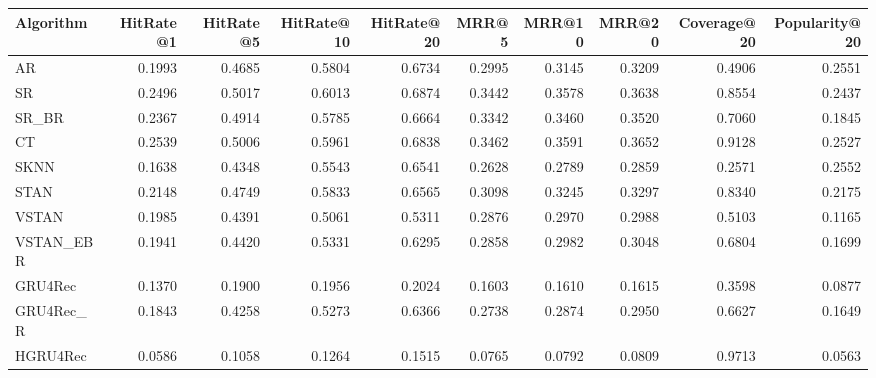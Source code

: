 \begin{tabular}{lrrrrrrrrr}
\toprule
 Algorithm &  HitRate@1 &  HitRate@5 &  HitRate@10 &  HitRate@20 &   MRR@5 &  MRR@10 &  MRR@20 &  Coverage@20 &  Popularity@20 \\
\midrule
        AR &     0.1993 &     0.4685 &      0.5804 &      0.6734 &  0.2995 &  0.3145 &  0.3209 &       0.4906 &         0.2551 \\
        SR &     0.2496 &     0.5017 &      0.6013 &      0.6874 &  0.3442 &  0.3578 &  0.3638 &       0.8554 &         0.2437 \\
     SR\_BR &     0.2367 &     0.4914 &      0.5785 &      0.6664 &  0.3342 &  0.3460 &  0.3520 &       0.7060 &         0.1845 \\
        CT &     0.2539 &     0.5006 &      0.5961 &      0.6838 &  0.3462 &  0.3591 &  0.3652 &       0.9128 &         0.2527 \\
      SKNN &     0.1638 &     0.4348 &      0.5543 &      0.6541 &  0.2628 &  0.2789 &  0.2859 &       0.2571 &         0.2552 \\
      STAN &     0.2148 &     0.4749 &      0.5833 &      0.6565 &  0.3098 &  0.3245 &  0.3297 &       0.8340 &         0.2175 \\
     VSTAN &     0.1985 &     0.4391 &      0.5061 &      0.5311 &  0.2876 &  0.2970 &  0.2988 &       0.5103 &         0.1165 \\
 VSTAN\_EBR &     0.1941 &     0.4420 &      0.5331 &      0.6295 &  0.2858 &  0.2982 &  0.3048 &       0.6804 &         0.1699 \\
   GRU4Rec &     0.1370 &     0.1900 &      0.1956 &      0.2024 &  0.1603 &  0.1610 &  0.1615 &       0.3598 &         0.0877 \\
 GRU4Rec\_R &     0.1843 &     0.4258 &      0.5273 &      0.6366 &  0.2738 &  0.2874 &  0.2950 &       0.6627 &         0.1649 \\
  HGRU4Rec &     0.0586 &     0.1058 &      0.1264 &      0.1515 &  0.0765 &  0.0792 &  0.0809 &       0.9713 &         0.0563 \\
\bottomrule
\end{tabular}
